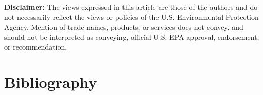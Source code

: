 \begin{refsection}[referencesCh6]
\textbf{Disclaimer:} The views expressed in this article are those of the authors and do not necessarily reflect the views or policies of the U.S. Environmental Protection Agency. Mention of trade names, products, or services does not convey, and should not be interpreted as conveying, official U.S. EPA approval, endorsement, or recommendation. 

\section*{Bibliography}

\printbibliography[heading=none]
\end{refsection}